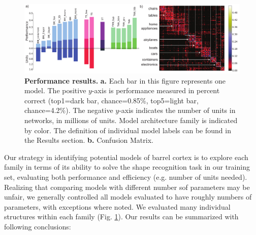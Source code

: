 \begin{figure}[h]
\includegraphics [width=1\linewidth]{figures/results.pdf}
\vspace{-2mm}
\caption{\textbf{Performance results.} \textbf{a.} Each bar in this figure represents one model. The positive $y$-axis is performance measured in percent correct (top1=dark bar, chance=0.85\%, top5=light bar, chance=4.2\%).   The negative $y$-axis indicates the number of units in networks, in millions of units. Model architecture family is indicated by color.  The definition of individual model labels can be found in the Results section. \textbf{b.} Confusion Matrix.~\label{fig_main}}
\end{figure}

Our strategy in identifying potential models of barrel cortex is to explore each family in terms of its ability to solve the shape recognition task in our training set, evaluating both performance and efficiency (e.g. number of units needed). 
Realizing that comparing models with different number sof parameters may be unfair, we generally controlled all models evaluated to have roughly numbers of parameters, with exceptions where noted.  
We evaluated many individual structures within each family (Fig. \ref{fig_main}). 
Our results can be summarized with following conclusions:


